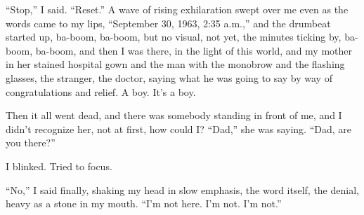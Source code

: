 \documentclass[11pt,a4paper]{article}
\newcommand{\qm}[1]{“#1”}
\begin{document}
\qm{Stop,} I said. \qm{Reset.} A wave of rising exhilaration swept over me even as the words came to my lips, \qm{September 30, 1963, 2:35 a.m.,} and the drumbeat started up, ba-boom, ba-boom, but no visual, not yet, the minutes ticking by, ba-boom, ba-boom, and then I was there, in the light of this world, and my mother in her stained hospital gown and the man with the monobrow and the flashing glasses, the stranger, the doctor, saying what he was going to say by way of congratulations and relief. A boy. It's a boy.

Then it all went dead, and there was somebody standing in front of me, and I didn't recognize her, not at first, how could I? \qm{Dad,} she was saying. \qm{Dad, are you there?}

I blinked. Tried to focus.

\qm{No,} I said finally, shaking my head in slow emphasis, the word itself, the denial, heavy as a stone in my mouth. \qm{I'm not here. I'm not. I'm not.}
\end{document}
